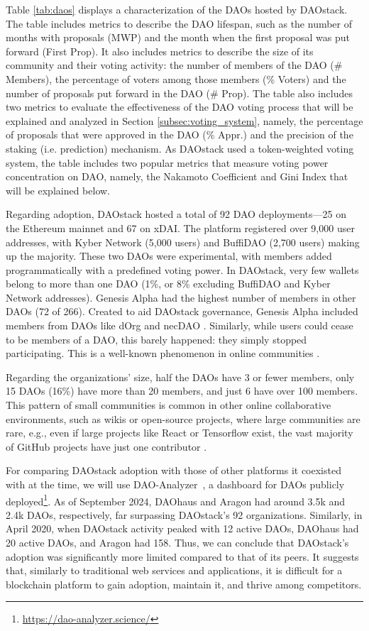 \documentclass[10pt,lineno]{wlpeerj}
\begin{document}
Table \ref{tab:daos} displays a characterization of the DAOs hosted by DAOstack. The table includes metrics to describe the DAO lifespan, such as the number of months with proposals (MWP) and the month when the first proposal was put forward (First Prop). It also includes metrics to describe the size of its community and their voting activity: the number of members of the DAO (\# Members), the percentage of voters among those members (\% Voters) and the number of proposals put forward in the DAO (\# Prop). The table also includes two metrics to evaluate the effectiveness of the DAO voting process that will be explained and analyzed in Section \ref{subsec:voting_system}, namely, the percentage of proposals that were approved in the DAO (\% Appr.) and the precision of the staking (i.e. prediction) mechanism. As DAOstack used a token-weighted voting system, the table includes two popular metrics that 
measure voting power concentration on DAO, namely, the Nakamoto Coefficient and Gini Index that will be explained below.

Regarding adoption, DAOstack hosted a total of 92 DAO deployments—25 on the Ethereum mainnet and 67 on xDAI. The platform registered over 9,000 user addresses, with Kyber Network (5,000 users) and BuffiDAO (2,700 users) making up the majority. These two DAOs were experimental, with members added programmatically with a predefined voting power. In DAOstack, very few wallets belong to more than one DAO (1\%, or 8\% excluding BuffiDAO and Kyber Network addresses). Genesis Alpha had the highest number of members in other DAOs (72 of 266). Created to aid DAOstack governance, Genesis Alpha included members from DAOs like dOrg and necDAO \citep{cryptocommons_genesis_2019}. Similarly, while users could cease to be members of a DAO, this barely happened: they simply stopped participating. This is a well-known phenomenon in online communities \citep{zhang_why_2015}. 

Regarding the organizations' size, half the DAOs have 3 or fewer members, only 15 DAOs (16\%) have more than 20 members, and just 6 have over 100 members. This pattern of small communities is common in other online collaborative environments, such as wikis or open-source projects, where large communities are rare, e.g., even if large projects like React or Tensorflow exist, the vast majority of GitHub projects have just one contributor \citep{dberkholz_size_2013}.

For comparing DAOstack adoption with those of other platforms it coexisted with at the time, we will use DAO-Analyzer~\citep{Arroyo2022}, a dashboard for DAOs publicly deployed\footnote{\url{https://dao-analyzer.science/}}. As of September 2024, DAOhaus and Aragon had around 3.5k and 2.4k DAOs, respectively, far surpassing DAOstack’s 92 organizations. Similarly, in April 2020, when DAOstack activity peaked with 12 active DAOs, DAOhaus had 20 active DAOs, and Aragon had 158. 
Thus, we can conclude that DAOstack's adoption was significantly more limited compared to that of its peers. It suggests that, similarly to traditional web services and applications, it is difficult for a blockchain platform to gain adoption, maintain it, and thrive among competitors.
\end{document}

